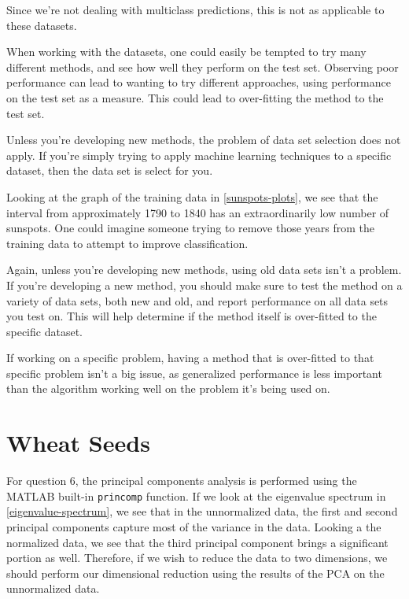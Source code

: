 \documentclass[11pt,a4paper]{article}
\begin{document}
\begin{description}
{        Since we're not dealing with multiclass predictions, this is not as
        applicable to these datasets.
    }
    \item[Human-loop overfitting] {
        When working with the datasets, one could easily be tempted to try
        many different methods, and see how well they perform on the test
        set. Observing poor performance can lead to wanting to try different
        approaches, using performance on the test set as a measure. This could
        lead to over-fitting the method to the test set.
    }
    \item[Data set selection] {
        Unless you're developing new methods, the problem of data set selection
        does not apply. If you're simply trying to apply machine learning
        techniques to a specific dataset, then the data set is select for you.
    }
    \item[Reprobleming] {
        Looking at the graph of the training data in \autoref{sunspots-plots},
        we see that the interval from approximately 1790 to 1840 has an
        extraordinarily low number of sunspots. One could imagine someone
        trying to remove those years from the training data to attempt to
        improve classification.
    }
    \item[Old datasets] {
        Again, unless you're developing new methods, using old data sets
        isn't a problem. If you're developing a new method, you should make
        sure to test the method on a variety of data sets, both new and old,
        and report performance on all data sets you test on. This will help
        determine if the method itself is over-fitted to the specific dataset.

        If working on a specific problem, having a method that is over-fitted
        to that specific problem isn't a big issue, as generalized performance
        is less important than the algorithm working well on the problem it's
        being used on.
    }
\end{description}

\section{Wheat Seeds}

For question 6, the principal components analysis is performed using the
MATLAB built-in \texttt{princomp} function. If we look at the eigenvalue
spectrum in \autoref{eigenvalue-spectrum}, we see that in the unnormalized
data, the first and second principal components capture most of the variance
in the data. Looking a the normalized data, we see that the third principal
component brings a significant portion as well. Therefore, if we wish to
reduce the data to two dimensions, we should perform our dimensional reduction
using the results of the PCA on the unnormalized data.
\end{document}
